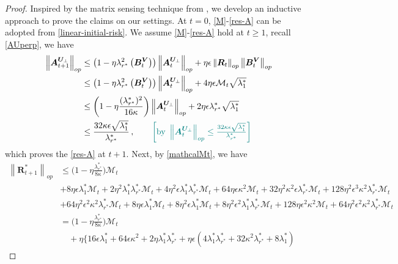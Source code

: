 \begin{proof}
Inspired by the matrix sensing technique from \cite{xiong2023over}, we develop an inductive approach to prove the claims on our settings.
    At $t=0$, \cref{M}-\cref{res-A} can be adopted from \cref{linear-initial-risk}. We assume \cref{M}-\cref{res-A} hold at $t\geq 1$, recall \cref{AUperp}, we have
    \begin{align*}
        \left\|\bm A^{\bm U_\perp}_{t+1}\right\|_{op} & \leq \left(1-\eta \lambda_{r^*}^2\left(\bm B_t^{\bm V}\right)\right) \left\|\bm A^{\bm U_\perp}_t\right\|_{op} + \eta \epsilon \left\|\bm R_t\right\|_{op} \left\|\bm B_t^{\bm V}\right\|_{op}\\
        & \leq \left(1-\eta \lambda_{r^*}^2\left(\bm B_t^{\bm V}\right)\right) \left\|\bm A^{\bm U_\perp}_t\right\|_{op} + 4 \eta \epsilon \mathcal{M}_t \sqrt{\lambda_1^*}\\
        & \leq \bigg(1-\eta \frac{(\lambda^*_{r^*})^2}{16\kappa}\bigg)\left\|\bm A^{\bm U_\perp}_t\right\|_{op} + 2 \eta \epsilon \lambda^*_{r^*} \sqrt{\lambda_1^*}\\
        & \leq \frac{32 \kappa \epsilon\sqrt{\lambda_1^*}}{\lambda^*_{r^*}}\,, \tag*{\color{teal}$\left[\text{by }\left\|\bm A^{\bm U_\perp}_t\right\|_{op}\leq \frac{32 \kappa \epsilon\sqrt{\lambda_1^*}}{\lambda^*_{r^*}}\right]$}
    \end{align*}
    which proves the \cref{res-A} at $t+1$. Next, by \cref{mathcalMt}, we have
    \begin{align*}
        \left\|\bm R^*_{t+1}\right\|_{op} & \leq \bigg(1-\eta \frac{\lambda^*_{r^*}}{8\kappa}\bigg)\mathcal{M}_t\\
        & + 8 \eta \epsilon \lambda_1^* \mathcal{M}_t + 2\eta^2 \lambda_1^*\lambda_{r^*}^*\mathcal{M}_t + 4\eta^2 \epsilon \lambda_1^*\lambda_{r^*}^*\mathcal{M}_t
         + 64 \eta \epsilon \kappa^2 \mathcal{M}_t
        +32 \eta^2 \kappa^2 \epsilon\lambda^*_{r^*}\mathcal{M}_t+ 128 \eta^2 \epsilon^3 \kappa^2 \lambda_{r^*}^*\mathcal{M}_t\\
        & +64\eta^2 \epsilon^2  \kappa^2 \lambda_{r^*}^* \mathcal{M}_t+8\eta \epsilon \lambda_1^* \mathcal{M}_t
         + 8 \eta^2 \epsilon \lambda_1^* \mathcal{M}_t + 8 \eta^2 \epsilon^2 \lambda_1^* \lambda_{r^*}^* \mathcal{M}_t
         + 128 \eta \epsilon^2 \kappa^2 \mathcal{M}_t+64\eta^2 \epsilon^2  \kappa^2 \lambda_{r^*}^* \mathcal{M}_t\\
        & = \bigg(1-\eta \frac{\lambda^*_{r^*}}{8\kappa}\bigg)\mathcal{M}_t\\
        & \quad + \eta\Bigg\{16\epsilon \lambda_1^*+64\epsilon \kappa^2+2\eta \lambda_1^*\lambda_{r^*}^*+\eta\epsilon\left(4\lambda_1^*\lambda_{r^*}^*+32\kappa^2\lambda_{r^*}^*+8\lambda_1^*\right)

\end{align*}
\end{proof}
